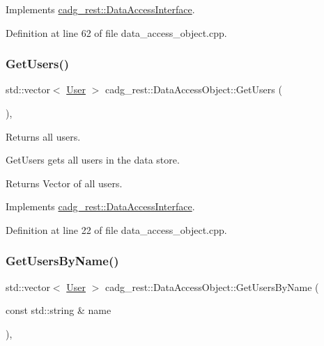 Implements \mbox{\hyperlink{classcadg__rest_1_1_data_access_interface_a9df9cb8876073f42e7e54ada41eec3b3}{cadg\+\_\+rest\+::\+Data\+Access\+Interface}}.



Definition at line 62 of file data\+\_\+access\+\_\+object.\+cpp.

\mbox{\label{classcadg__rest_1_1_data_access_object_a52d1c1333fc65e6a3a6276d044296ca0}} 
\subsubsection{\texorpdfstring{GetUsers()}{GetUsers()}}
{\footnotesize\ttfamily std\+::vector$<$ \mbox{\hyperlink{structcadg__rest_1_1_user}{User}} $>$ cadg\+\_\+rest\+::\+Data\+Access\+Object\+::\+Get\+Users (\begin{DoxyParamCaption}{ }\end{DoxyParamCaption})\hspace{0.3cm}{\ttfamily [override]}, {\ttfamily [virtual]}}



Returns all users. 

Get\+Users gets all users in the data store. \begin{DoxyReturn}{Returns}
Vector of all users. 
\end{DoxyReturn}


Implements \mbox{\hyperlink{classcadg__rest_1_1_data_access_interface_a657bd814589e6c5553a0303115350783}{cadg\+\_\+rest\+::\+Data\+Access\+Interface}}.



Definition at line 22 of file data\+\_\+access\+\_\+object.\+cpp.

\mbox{\label{classcadg__rest_1_1_data_access_object_af08156c296e0ec18d9885292a549eef8}} 
\subsubsection{\texorpdfstring{GetUsersByName()}{GetUsersByName()}}
{\footnotesize\ttfamily std\+::vector$<$ \mbox{\hyperlink{structcadg__rest_1_1_user}{User}} $>$ cadg\+\_\+rest\+::\+Data\+Access\+Object\+::\+Get\+Users\+By\+Name (\begin{DoxyParamCaption}\item[{const std\+::string \&}]{name }\end{DoxyParamCaption})\hspace{0.3cm}{\ttfamily [override]}, {\ttfamily [virtual]}}



